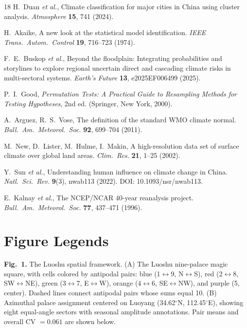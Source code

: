 \documentclass[9pt,twocolumn]{article}
\begin{document}
\begin{thebibliography}{18}
 H.~Duan \textit{et al.}, Climate classification for major cities in China using cluster analysis. \textit{Atmosphere} \textbf{15}, 741 (2024).

 H.~Akaike, A new look at the statistical model identification. \textit{IEEE Trans.~Autom.~Control} \textbf{19}, 716--723 (1974).

 F.~E.~Buskop \textit{et al.}, Beyond the floodplain: Integrating probabilities and storylines to explore regional uncertain direct and cascading climate risks in multi-sectoral systems. \textit{Earth's Future} \textbf{13}, e2025EF006499 (2025).

 P.~I.~Good, \textit{Permutation Tests: A Practical Guide to Resampling Methods for Testing Hypotheses}, 2nd ed. (Springer, New York, 2000).

 A.~Arguez, R.~S.~Vose, The definition of the standard WMO climate normal. \textit{Bull.~Am.~Meteorol.~Soc.} \textbf{92}, 699--704 (2011).

 M.~New, D.~Lister, M.~Hulme, I.~Makin, A high-resolution data set of surface climate over global land areas. \textit{Clim.~Res.} \textbf{21}, 1--25 (2002).

 Y.~Sun \textit{et al.}, Understanding human influence on climate change in China. \textit{Natl.~Sci.~Rev.} \textbf{9}(3), nwab113 (2022). DOI: 10.1093/nsr/nwab113.

 E.~Kalnay \textit{et al.}, The NCEP/NCAR 40-year reanalysis project. \textit{Bull.~Am.~Meteorol.~Soc.} \textbf{77}, 437--471 (1996).

\end{thebibliography}

\newpage
\section*{Figure Legends}

\noindent\textbf{Fig.~1.} The Luoshu spatial framework. (A) The Luoshu nine-palace magic square, with cells colored by antipodal pairs: blue (1$\leftrightarrow$9, N$\leftrightarrow$S), red (2$\leftrightarrow$8, SW$\leftrightarrow$NE), green (3$\leftrightarrow$7, E$\leftrightarrow$W), orange (4$\leftrightarrow$6, SE$\leftrightarrow$NW), and purple (5, center). Dashed lines connect antipodal pairs whose sums equal 10. (B) Azimuthal palace assignment centered on Luoyang (34.62$^\circ$N, 112.45$^\circ$E), showing eight equal-angle sectors with seasonal amplitude annotations. Pair means and overall CV $= 0.061$ are shown below.
\end{document}
